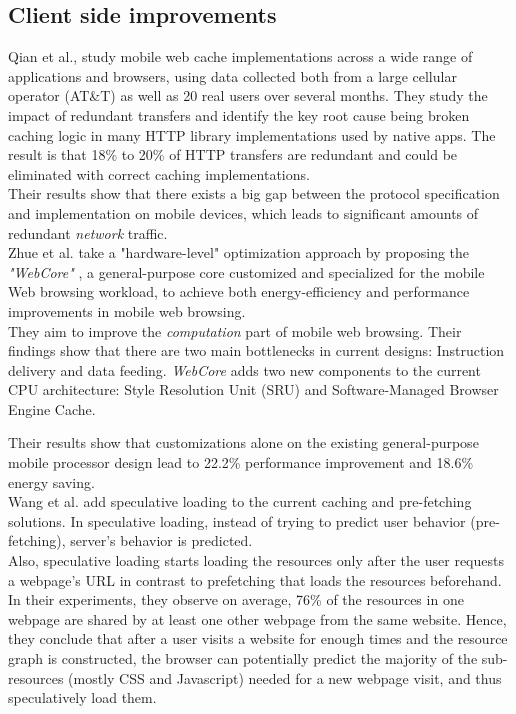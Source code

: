   \subsection {Client side improvements}
Qian et al.\cite{webcaching}, study  mobile web cache implementations across a wide range of applications and browsers, using data collected both from a large cellular operator (AT\&T) as well as 20 real users over several months. They study the impact of redundant transfers and identify the key root cause being broken caching logic in many HTTP library implementations used by native apps.  The result is that 18\% to 20\%  of HTTP transfers are redundant and could be eliminated with correct caching implementations.\\
Their results show that there exists a big gap between the protocol specification and implementation on mobile devices, which leads to significant amounts of redundant {\em network} traffic.\\

\noindent Zhue et al. \cite{webcore} take a "hardware-level" optimization approach by proposing the {\em "WebCore"} , a general-purpose core customized and specialized for the mobile Web browsing workload, to achieve both energy-efficiency and performance improvements in mobile web browsing.\\
 They aim to improve the {\em computation} part of mobile web browsing.
Their findings show that there are two main bottlenecks in current designs: Instruction delivery and data feeding.
{\em WebCore} adds two new components to the current CPU architecture:  Style Resolution Unit (SRU) and Software-Managed Browser Engine Cache.

\noindent Their results show that customizations alone on the existing general-purpose mobile processor design lead to 22.2\% performance improvement and 18.6\% energy saving.\\

 \noindent Wang et al.\cite{wang_www2012} add speculative loading to the current caching and pre-fetching solutions. In speculative loading, instead of trying to predict user behavior (pre-fetching), server's behavior is predicted.\\
Also, speculative loading starts loading the resources only after the user requests a webpage's URL in contrast to prefetching that loads the resources beforehand.\\
In their experiments, they observe on average, 76\% of the resources in one webpage are shared by at least one other webpage from the same website. Hence, they conclude that after a user visits a website for enough times and the resource graph is constructed, the browser can potentially predict the majority of the sub-resources (mostly CSS and Javascript) needed for a new webpage visit, and thus speculatively load them.\\

